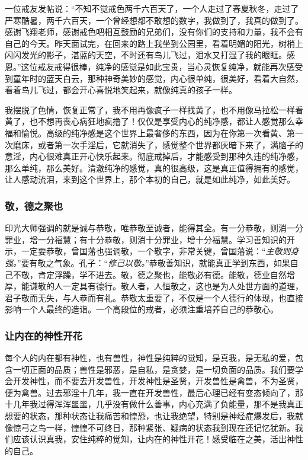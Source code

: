 一位戒友发帖说：“不知不觉戒色两千六百天了，一个人走过了春夏秋冬，走过了严寒酷暑，两千六百天，一个曾经想都不敢想的数字，我做到了，我真的做到了。感谢飞翔老师，感谢戒色吧相互鼓励的兄弟们，没有你们的支持和力量，我不会有自己的今天。昨天面试完，在回来的路上我坐到公园里，看着明媚的阳光，树梢上闪闪发光的影子，湛蓝的天空，不时还有鸟儿飞过，泪水又打湿了我的眼眶。感恩。”这位戒友戒得很棒，纯净的感觉是如此宝贵，当心灵恢复纯净，就能再次感受到童年时的蓝天白云，那种神奇美妙的感觉，内心很单纯，很美好，看着大自然，看着鸟儿飞过，都会开心喜悦地笑起来，就像纯真的孩子一样。

我摆脱了色情，恢复正常了，我不用再像疯子一样找黄了，也不用像马拉松一样看黄了，也不想再丧心病狂地疯撸了！仅仅是享受内心的纯净感，都让人感觉那么幸福和愉悦。高级的纯净感是这个世界上最奢侈的东西，因为在你第一次看黄、第一次磨床，或者第一次手淫后，它就消失了，感觉整个世界都灰暗下来了，满脑子的意淫，内心很难真正开心快乐起来。彻底戒掉后，才能感受到那种久违的纯净感，那么单纯，那么美好。清澈纯净的感觉，真的很高级，这是真正值得拥有的感觉，让人感动流泪，来到这个世界上，那个本初的自己，就是如此纯净，如此美好。

\subsubsection{敬，德之聚也}

印光大师强调的就是诚与恭敬，唯恭敬至诚者，能得其全。有一分恭敬，则消一分罪业，增一分福慧；有十分恭敬，则消十分罪业，增十分福慧。学习善知识的开示，一定要恭敬，曾国藩也强调敬，一个敬字，非常关键，曾国藩说：“\textit{主敬则身强。}”要有敬之气象。孔子：“\textit{修己以敬。}”恭敬善知识，就能真正学到东西，如果自己不敬，肯定浮躁，学不进去。敬，德之聚也，能敬必有德。能敬，德业自然增厚，能谦敬的人一定具有德行。敬人者，人恒敬之，这也是为人处世方面的道理，君子敬而无失，与人恭而有礼。恭敬太重要了，不仅是一个人德行的体现，也直接影响一个人最终的造诣。一个高段位的戒者，必须注重培养自己的恭敬心。

\subsubsection{让内在的神性开花}

每个人的内在都有神性，也有兽性，神性是纯粹的觉知，是真我，是无私的爱，包含一切正面的品质；兽性是邪恶，是自私，是贪婪，是一切负面的品质。我们要学会开发神性，而不要去开发兽性，开发神性是圣贤，开发兽性是禽兽，不为圣贤，便为禽兽。过去邪淫十几年，我一直在开发兽性，最后心理已经有变态倾向了，那十几年我过得浑浑噩噩，几乎没有做什么善事，内心充满了负能量，那不是我真正想要的状态，那种状态让我痛苦和惶恐，也让我绝望，特别是神经症爆发后，我就像惊弓之鸟一样，惶惶不可终日，那种紧张、疑病的状态我到现在还记忆犹新。我们应该认识真我，安住纯粹的觉知，让内在的神性开花！感受临在之美，活出神性的自己。

